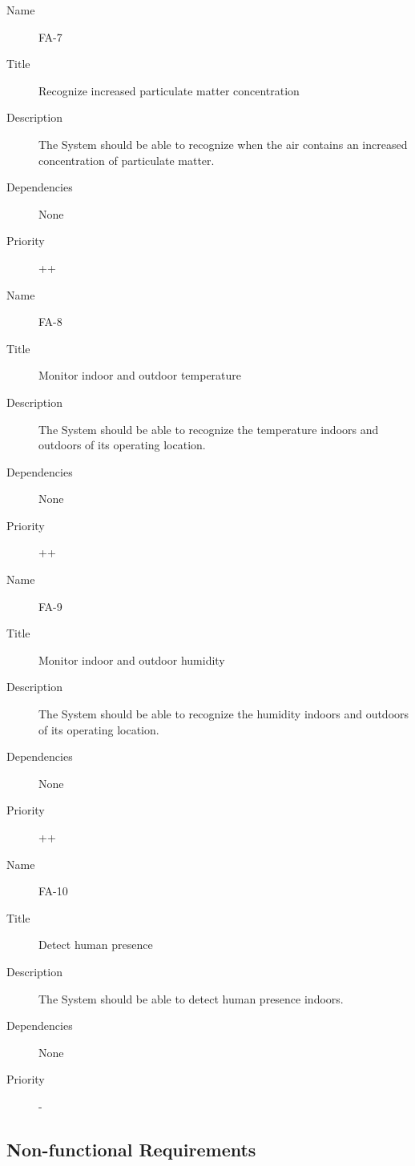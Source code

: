 \documentclass[runningheads]{llncs}
\begin{document}
    \begin{description}
        \item[Name] FA-7
        \item[Title] Recognize increased particulate matter concentration
        \item[Description] The System should be able to recognize when the air contains an increased concentration of particulate matter.
        \item[Dependencies] None
        \item[Priority] ++
    \end{description}

    \begin{description}
        \item[Name] FA-8
        \item[Title] Monitor indoor and outdoor temperature
        \item[Description] The System should be able to recognize the temperature indoors and outdoors of its operating location.
        \item[Dependencies] None
        \item[Priority] ++
    \end{description}

    \begin{description}
        \item[Name] FA-9
        \item[Title] Monitor indoor and outdoor humidity
        \item[Description] The System should be able to recognize the humidity indoors and outdoors of its operating location.
        \item[Dependencies] None
        \item[Priority] ++
    \end{description}

    \begin{description}
        \item[Name] FA-10
        \item[Title] Detect human presence
        \item[Description] The System should be able to detect human presence indoors.
        \item[Dependencies] None
        \item[Priority] -
    \end{description}

    \subsection{Non-functional Requirements}
\end{document}
